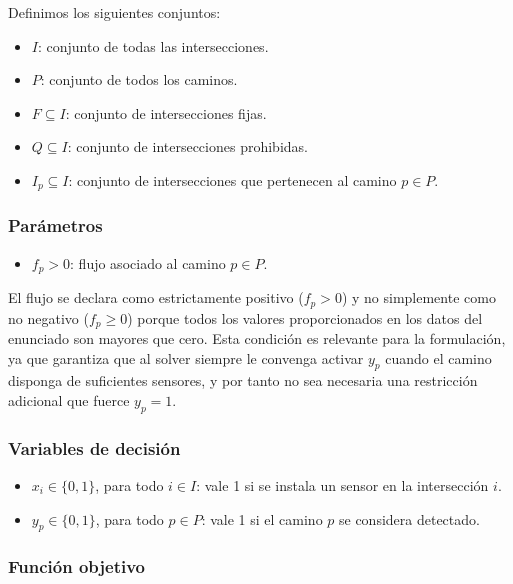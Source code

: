 \documentclass[12pt,a4paper]{article}
\begin{document}
Definimos los siguientes conjuntos:

\begin{itemize}
    \item \(I\): conjunto de todas las intersecciones.
    \item \(P\): conjunto de todos los caminos.
    \item \(F \subseteq I\): conjunto de intersecciones fijas.
    \item \(Q \subseteq I\): conjunto de intersecciones prohibidas.
    \item \(I_p \subseteq I\): conjunto de intersecciones que pertenecen al camino \(p \in P\).
\end{itemize}

\subsubsection{Parámetros}

\begin{itemize}
    \item \(f_p > 0\): flujo asociado al camino \(p \in P\).
\end{itemize}

El flujo se declara como estrictamente positivo (\(f_p > 0\)) y no simplemente como no negativo (\(f_p \geq 0\)) porque todos los valores proporcionados en los datos del enunciado son mayores que cero. Esta condición es relevante para la formulación, ya que garantiza que al solver siempre le convenga activar \(y_p\) cuando el camino disponga de suficientes sensores, y por tanto no sea necesaria una restricción adicional que fuerce \(y_p = 1\).

\subsubsection{Variables de decisión}

\begin{itemize}
    \item \(x_i \in \{0,1\}\), para todo \(i \in I\): vale 1 si se instala un sensor en la intersección \(i\).
    \item \(y_p \in \{0,1\}\), para todo \(p \in P\): vale 1 si el camino \(p\) se considera detectado.
\end{itemize}

\subsubsection{Función objetivo}
\end{document}
